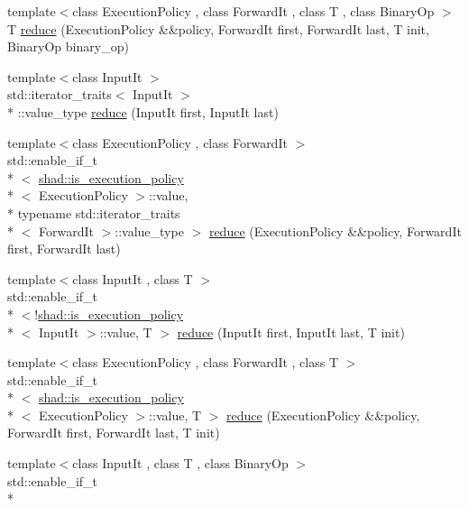 \begin{DoxyCompactItemize}
\item 
{\footnotesize template$<$class Execution\-Policy , class Forward\-It , class T , class Binary\-Op $>$ }\\T \hyperlink{namespaceshad_a23bc7c39dc6aa69f526570d07967a185}{reduce} (Execution\-Policy \&\&policy, Forward\-It first, Forward\-It last, T init, Binary\-Op binary\-\_\-op)
\item 
{\footnotesize template$<$class Input\-It $>$ }\\std\-::iterator\-\_\-traits$<$ Input\-It $>$\\*
\-::value\-\_\-type \hyperlink{namespaceshad_a0cb65c2ad084f15e5fd33058445b7f10}{reduce} (Input\-It first, Input\-It last)
\item 
{\footnotesize template$<$class Execution\-Policy , class Forward\-It $>$ }\\std\-::enable\-\_\-if\-\_\-t\\*
$<$ \hyperlink{structshad_1_1is__execution__policy}{shad\-::is\-\_\-execution\-\_\-policy}\\*
$<$ Execution\-Policy $>$\-::value, \\*
typename std\-::iterator\-\_\-traits\\*
$<$ Forward\-It $>$\-::value\-\_\-type $>$ \hyperlink{namespaceshad_a329ef698d7c8b55b8b967ad07e9bf84d}{reduce} (Execution\-Policy \&\&policy, Forward\-It first, Forward\-It last)
\item 
{\footnotesize template$<$class Input\-It , class T $>$ }\\std\-::enable\-\_\-if\-\_\-t\\*
$<$!\hyperlink{structshad_1_1is__execution__policy}{shad\-::is\-\_\-execution\-\_\-policy}\\*
$<$ Input\-It $>$\-::value, T $>$ \hyperlink{namespaceshad_aea9e6912fe7e3a494de8b7eaad2fd345}{reduce} (Input\-It first, Input\-It last, T init)
\item 
{\footnotesize template$<$class Execution\-Policy , class Forward\-It , class T $>$ }\\std\-::enable\-\_\-if\-\_\-t\\*
$<$ \hyperlink{structshad_1_1is__execution__policy}{shad\-::is\-\_\-execution\-\_\-policy}\\*
$<$ Execution\-Policy $>$\-::value, T $>$ \hyperlink{namespaceshad_a047e9c9a109948515a14306d4a169893}{reduce} (Execution\-Policy \&\&policy, Forward\-It first, Forward\-It last, T init)
\item 
{\footnotesize template$<$class Input\-It , class T , class Binary\-Op $>$ }\\std\-::enable\-\_\-if\-\_\-t\\*

\end{DoxyCompactItemize}
